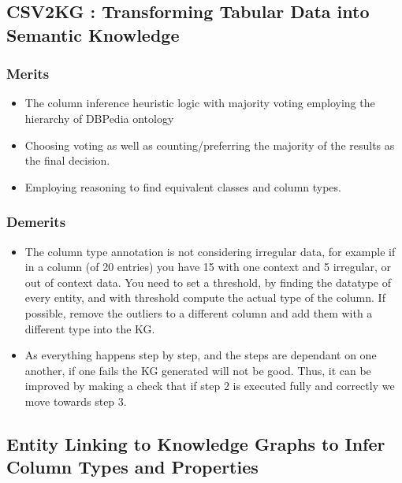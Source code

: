 \documentclass[runningheads]{llncs}
\begin{document}
\subsection{CSV2KG : Transforming Tabular Data into Semantic Knowledge}
\subsubsection*{Merits}
\begin{itemize}
    \item The column inference heuristic logic with majority voting employing the hierarchy of DBPedia ontology
    \item Choosing voting as well as counting/preferring the majority of the results as the final decision.
    \item Employing reasoning to find equivalent classes and column types.
\end{itemize}
\subsubsection*{Demerits}
\begin{itemize}
    \item The column type annotation is not considering irregular data, for example if in a column (of 20 entries) you have 15 with one context and 5 irregular, or out of context data. You need to set a threshold, by finding the datatype of every entity, and with threshold compute the actual type of the column. If possible, remove the outliers to a different column and add them with a different type into the KG.
    \item As everything happens step by step, and the steps are dependant on one another, if one fails the KG generated will not be good. Thus, it can be improved by making a check that if step 2 is executed fully and correctly we move towards step 3.
\end{itemize}
\subsection{Entity Linking to Knowledge Graphs to Infer Column Types and Properties}
\end{document}
